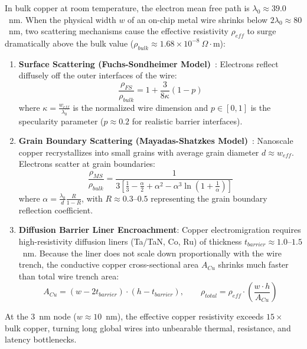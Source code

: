 In bulk copper at room temperature, the electron mean free path is $\lambda_0 \approx 39.0$~nm. When the physical width $w$ of an on-chip metal wire shrinks below $2 \lambda_0 \approx 80$~nm, two scattering mechanisms cause the effective resistivity $\rho_{eff}$ to surge dramatically above the bulk value ($\rho_{bulk} \approx 1.68 \times 10^{-8}\ \Omega\cdot\text{m}$):
\begin{enumerate}
    \item \textbf{Surface Scattering (Fuchs-Sondheimer Model)}~\cite{Fuchs1938,Sondheimer1952}: Electrons reflect diffusely off the outer interfaces of the wire:
    \begin{equation}
    \frac{\rho_{FS}}{\rho_{bulk}} = 1 + \frac{3}{8 \kappa} (1 - p)
    \label{eq:fuchs_sondheimer}
    \end{equation}
    where $\kappa = \frac{w_{eff}}{\lambda_0}$ is the normalized wire dimension and $p \in [0, 1]$ is the specularity parameter ($p \approx 0.2$ for realistic barrier interfaces).
    \item \textbf{Grain Boundary Scattering (Mayadas-Shatzkes Model)}~\cite{Mayadas1970}: Nanoscale copper recrystallizes into small grains with average grain diameter $d \approx w_{eff}$. Electrons scatter at grain boundaries:
    \begin{equation}
    \frac{\rho_{MS}}{\rho_{bulk}} = \frac{1}{3 \left[ \frac{1}{3} - \frac{\alpha}{2} + \alpha^2 - \alpha^3 \ln\left(1 + \frac{1}{\alpha}\right) \right]}
    \label{eq:mayadas_shatzkes}
    \end{equation}
    where $\alpha = \frac{\lambda_0}{d} \frac{R}{1 - R}$, with $R \approx 0.3$--$0.5$ representing the grain boundary reflection coefficient.
    \item \textbf{Diffusion Barrier Liner Encroachment}: Copper electromigration requires high-resistivity diffusion liners (Ta/TaN, Co, Ru) of thickness $t_{barrier} \approx 1.0$--$1.5$~nm. Because the liner does not scale down proportionally with the wire trench, the conductive copper cross-sectional area $A_{Cu}$ shrinks much faster than total wire trench area:
    \begin{equation}
    A_{Cu} = (w - 2 t_{barrier}) \cdot (h - t_{barrier}), \qquad \rho_{total} = \rho_{eff} \cdot \left(\frac{w \cdot h}{A_{Cu}}\right)
    \label{eq:barrier_liner}
    \end{equation}
\end{enumerate}

At the 3~nm node ($w \approx 10$~nm), the effective copper resistivity exceeds $15\times$ bulk copper, turning long global wires into unbearable thermal, resistance, and latency bottlenecks.

